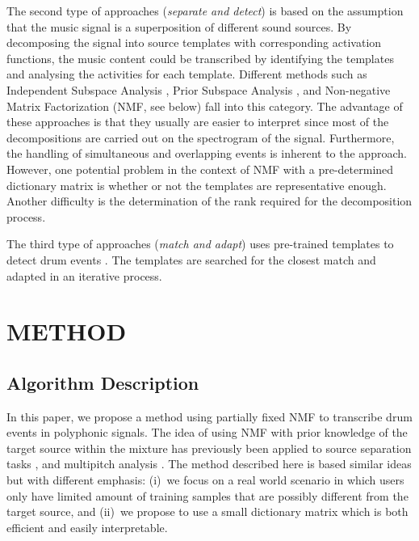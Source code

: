 \documentclass[a4paper]{article}
\begin{document}
The second type of approaches (\textit{separate and detect}) is based on the assumption that the music signal is a superposition of different sound sources. By decomposing the signal into source templates with corresponding activation functions, the music content could be transcribed by identifying the templates and analysing the activities for each template. 
Different methods such as Independent Subspace Analysis \cite{fitzgerald_sub-band_2002}, Prior Subspace Analysis \cite{fitzgerald_Drum_2003}, and Non-negative Matrix Factorization (NMF, see below) \cite{moreau_Drum_2007,alves_Drum_2009} fall into this category. The advantage of these approaches is that they usually are easier to interpret since most of the decompositions are carried out on the spectrogram of the signal. Furthermore, the handling of simultaneous and overlapping events is inherent to the approach. However, one potential problem in the context of NMF with a pre-determined dictionary matrix is whether or not the templates are representative enough. Another difficulty is the determination of the rank required for the decomposition process. 

The third type of approaches (\textit{match and adapt}) uses pre-trained templates to detect drum events \cite{yoshii_Drum_2007}. The templates are searched for the closest match and adapted in an iterative process.
\vspace{-2mm}
\section{METHOD}\label{sec:method}
\subsection{Algorithm Description}\label{subsec:algorithm description}
In this paper, we propose a method using partially fixed NMF to transcribe drum events in polyphonic signals. The idea of using NMF with prior knowledge of the target source within the mixture has previously been applied to source separation tasks \cite{smaragdis_ssnmf_2007}, and multipitch analysis \cite{raczynski_Hnmf_2007}. The method described here is based similar ideas but with different emphasis: 
(i)~we focus on a real world scenario in which users only have limited amount of training samples that are possibly different from the target source, and
(ii)~we propose to use a small dictionary matrix which is both efficient and easily interpretable.  
\end{document}
